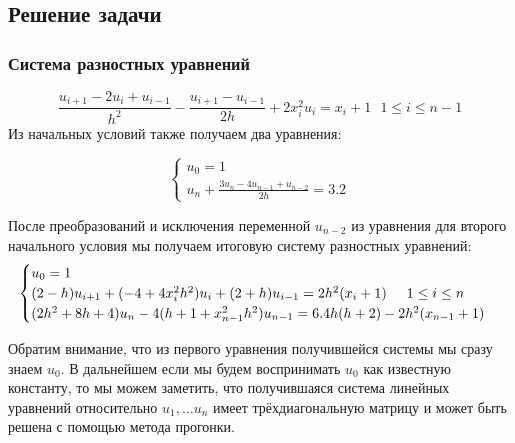 \documentclass[12pt]{article}%
\begin{document}
\subsection{Решение задачи}
\subsubsection{Система разностных уравнений}
\begin{equation*}
    \frac{u_{i + 1} - 2 u_i + u_{i-1}}{h^2} -
    \frac{u_{i+1} - 
    u_{i-1}}{2h} + 2x_i^2 u_i = 
    x_i + 1\ \ \ 1 \le i \le n-1
\end{equation*}
Из начальных условий также получаем два уравнения:

\begin{equation*}
\begin{cases}
    u_0 = 1 \\
    u_n + \frac{3 u_n - 4u_{n-1} + u_{n-2}}{2h} = 3.2
\end{cases}
\end{equation*}

После преобразований и исключения переменной $u_{n-2}$ из уравнения для второго начального условия мы получаем итоговую систему разностных уравнений:
\begin{equation*}
\begin{cases}
    u_0 = 1 \\
    (2 - h) u_{i+1} + (-4 + 4x_i^2 h^2) u_i + (2 + h)u_{i-1} = 
    2h^2 (x_i + 1) \hspace{0.5cm} 1 \le i \le n \\
    (2h^2 + 8h + 4) u_n - 4(h + 1 + x_{n-1}^2 h^2) u_{n-1} = 
    6.4h(h + 2) - 2 h^2 (x_{n-1} + 1)
\end{cases}
\end{equation*}

Обратим внимание, что из первого уравнения получившейся системы мы сразу знаем $u_0$. В дальнейшем если мы будем воспринимать $u_0$ как известную константу, то мы можем заметить, что получившаяся система линейных уравнений относительно $u_1, \dots u_n$ имеет трёхдиагональную матрицу и может быть решена с помощью метода прогонки. 


\end{document}

